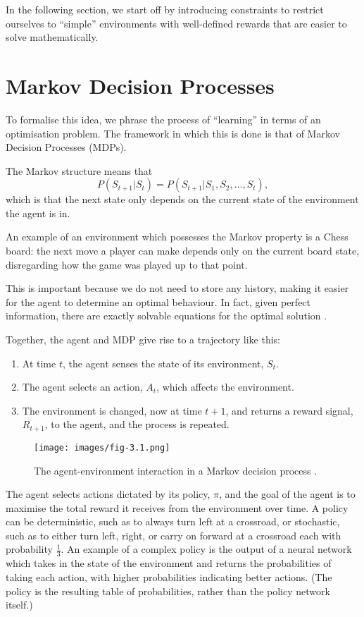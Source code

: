 \documentclass{article}
\begin{document}
In the following section, we start off by introducing constraints to restrict ourselves to ``simple'' environments with well-defined rewards that are easier to solve mathematically. 

\section{Markov Decision Processes}

To formalise this idea, we phrase the process of ``learning'' in terms of an optimisation problem. The framework in which this is done is that of Markov Decision Processes (MDPs).

The Markov structure means that $$P(S_{t+1} | S_t) = P(S_{t+1} | S_1, S_2, \dots, S_t),$$ which is that the next state only depends on the current state of the environment the agent is in. 

An example of an environment which possesses the Markov property is a Chess board: the next move a player can make depends only on the current board state, disregarding how the game was played up to that point. 

This is important because we do not need to store any history, making it easier for the agent to determine an optimal behaviour. In fact, given perfect information, there are exactly solvable equations for the optimal solution \cite{}.

Together, the agent and MDP give rise to a trajectory like this:

\begin{enumerate}
  \item{At time $t$, the agent senses the state of its environment, $S_t$.}
  \item{The agent selects an action, $A_t$, which affects the environment.}
  \item{The environment is changed, now at time $t+1$, and returns a reward signal, $R_{t+1}$, to the agent, and the process is repeated.}
\end{enumerate}

\begin{figure}[h]
  \centering
  \texttt{[image: images/fig-3.1.png]}
  \caption{The agent-environment interaction in a Markov decision process \cite{Sutton1998}.}
\end{figure}

The agent selects actions dictated by its policy, $\pi$, and the goal of the agent is to maximise the total reward it receives from the environment over time. A policy can be deterministic, such as to always turn left at a crossroad, or stochastic, such as to either turn left, right, or carry on forward at a crossroad each with probability $\frac{1}{3}$. An example of a complex policy is the output of a neural network which takes in the state of the environment and returns the probabilities of taking each action, with higher probabilities indicating better actions. (The policy is the resulting table of probabilities, rather than the policy network itself.)
\end{document}

